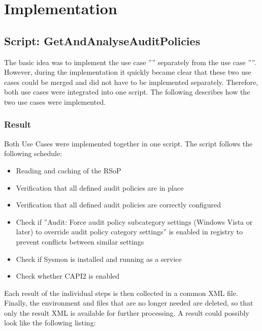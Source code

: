 \section{Implementation}

\subsection{Script: GetAndAnalyseAuditPolicies}
The basic idea was to implement the use case '''' separately from the use case ''''. However, during the implementation it quickly became clear that these two use cases could be merged and did not have to be implemented separately. Therefore, both use cases were integrated into one script. The following describes how the two use cases were implemented.

\subsubsection{Result}\label{GetAndAnalyseAuditPoliciesResult}
Both Use Cases were implemented together in one script. The script follows the following schedule:
\begin{itemize}
    \item Reading and caching of the RSoP
    \item Verification that all defined audit policies are in place
    \item Verification that all defined audit policies are correctly configured
    \item Check if ''Audit: Force audit policy subcategory settings (Windows Vista or later) to override audit policy category settings'' is enabled in registry to prevent conflicts between similar settings
    \item Check if Sysmon is installed and running as a service
    \item Check whether CAPI2 is enabled
\end{itemize}
Each result of the individual steps is then collected in a common XML file. Finally, the environment and files that are no longer needed are deleted, so that only the result XML is available for further processing. A result could possibly look like the following listing:

